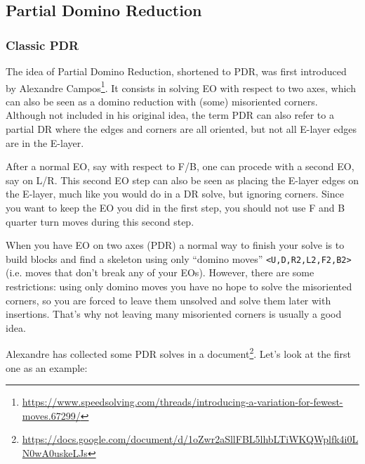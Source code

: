 \documentclass[11pt,a4paper]{book}
\newcommand{\m}{\texttt}
\begin{document}
\subsection{Partial Domino Reduction}
\label{sec:PDR}

\subsubsection{Classic PDR}

The idea of Partial Domino Reduction, shortened to PDR, was first introduced by Alexandre Campos\footnote{\url{https://www.speedsolving.com/threads/introducing-a-variation-for-fewest-moves.67299/}}. It consists in solving EO with respect to two axes, which can also be seen as a domino reduction with (some) misoriented corners. Although not included in his original idea, the term PDR can also refer to a partial DR where the edges and corners are all oriented, but not all E-layer edges are in the E-layer.

After a normal EO, say with respect to F/B, one can procede with a second EO, say on L/R. This second EO step can also be seen as placing the E-layer edges on the E-layer, much like you would do in a DR solve, but ignoring corners. Since you want to keep the EO you did in the first step, you should not use F and B quarter turn moves during this second step.

When you have EO on two axes (PDR) a normal way to finish your solve is to build blocks and find a skeleton using only ``domino moves'' \m{<U,D,R2,L2,F2,B2>} (i.e. moves that don't break any of your EOs). However, there are some restrictions: using only domino moves you have no hope to solve the misoriented corners, so you are forced to leave them unsolved and solve them later with insertions. That's why not leaving many misoriented corners is usually a good idea.

Alexandre has collected some PDR solves in a document\footnote{\url{https://docs.google.com/document/d/1oZwr2aSllFBL5lhbLTiWKQWplfk4i0LN0wA0uskeLJs}}. Let's look at the first one as an example:
\end{document}
